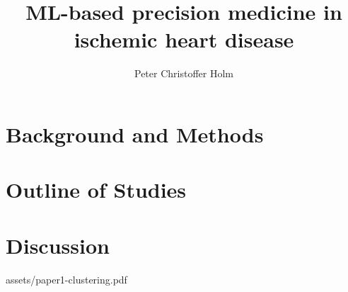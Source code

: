 \documentclass[a4paper, twoside, nobib]{tufte-book}
\title{ML-based precision medicine in ischemic heart disease}
\author[Peter Christoffer Holm]{Peter Christoffer Holm}
\begin{document}
\frontmatter
\maketitle


\cleardoublepage
\tableofcontents
\listoffigures
\listoftables


\cleardoublepage

\mainmatter %

\part{Background and Methods}

\part{Outline of Studies}

\part{Discussion}



\backmatter %

\printbibliography

\mainmatter %

\appendix
\appendixpage
\addappheadtotoc
\cleardoublepage

%
    {assets/paper1-clustering.pdf}
\end{document}
